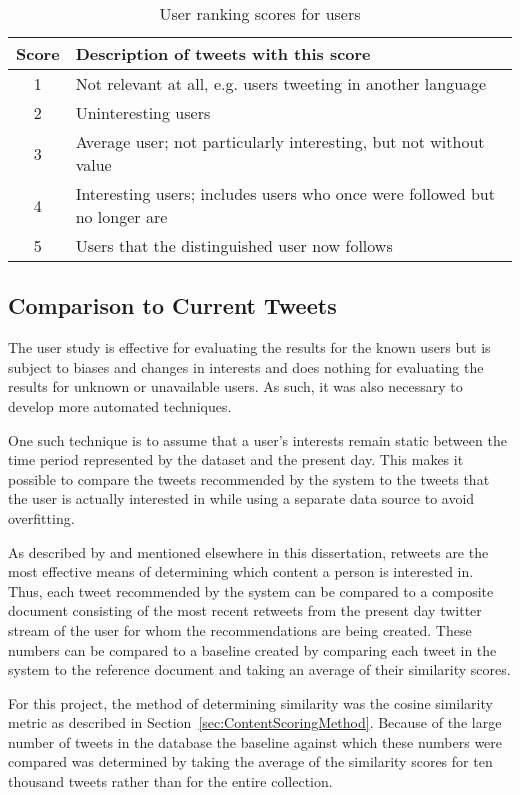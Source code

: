 \begin{table}
\centering
\begin{tabular}{c|l}
{\bf Score} & {\bf Description of tweets with this score} \\ \hline
1 & Not relevant at all, e.g. users tweeting in another language \\ \hline
2 & Uninteresting users \\ \hline
3 & Average user; not particularly interesting, but not without value \\ \hline
4 & Interesting users;  includes users who once were followed but no longer are \\ \hline
5 & Users that the distinguished user now follows \\
\end{tabular}
\caption{User ranking scores for users}
\label{tab:UserRankingScoresForUsers}
\end{table}


\subsection{Comparison to Current Tweets}

The user study is effective for evaluating the results for the known users but is subject to biases and changes in interests and does nothing for evaluating the results for unknown or unavailable users. As such, it was also necessary to develop more automated techniques.

One such technique is to assume that a user's interests remain static between the time period represented by the dataset and the present day. This makes it possible to compare the tweets recommended by the system to the tweets that the user is actually interested in while using a separate data source to avoid overfitting.

As described by \cite{Welch2011} and mentioned elsewhere in this dissertation, retweets are the most effective means of determining which content a person is interested in. Thus, each tweet recommended by the system can be compared to a composite document consisting of the most recent retweets from the present day twitter stream of the user for whom the recommendations are being created. These numbers can be compared to a baseline created by comparing each tweet in the system to the reference document and taking an average of their similarity scores.

For this project, the method of determining similarity was the cosine similarity metric as described in Section~\ref{sec:ContentScoringMethod}. Because of the large number of tweets in the database the baseline against which these numbers were compared was determined by taking the average of the similarity scores for ten thousand tweets rather than for the entire collection.

